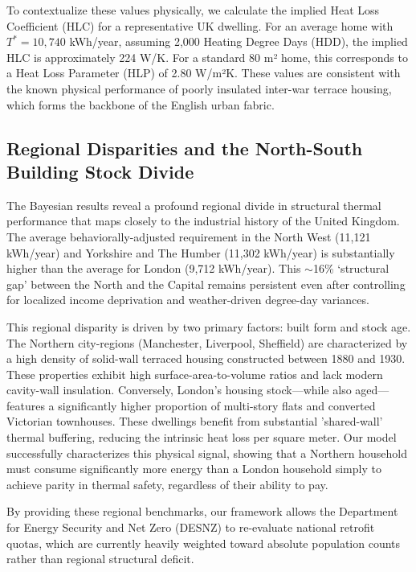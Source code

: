 \documentclass[11pt, a4paper, twocolumn, numbers]{elsarticle}
\begin{document}
To contextualize these values physically, we calculate the implied Heat Loss Coefficient (HLC) 
for a representative UK dwelling. For an average home with $T^* = 10{,}740$ kWh/year, 
assuming 2,000 Heating Degree Days (HDD), the implied HLC is approximately 224 W/K. 
For a standard 80 m² home, this corresponds to a Heat Loss Parameter (HLP) of 2.80 W/m²K. These values are consistent with the known physical performance of poorly insulated inter-war terrace housing, which forms the backbone of the English urban fabric.

\subsection{Regional Disparities and the North-South Building Stock Divide}\label{regional-disparities}

The Bayesian results reveal a profound regional divide in structural thermal performance that maps closely to the industrial history of the United Kingdom. The average behaviorally-adjusted requirement in the North West (11,121 kWh/year) and Yorkshire and The Humber (11,302 kWh/year) is substantially higher than the average for London (9,712 kWh/year). This $\sim$16\% `structural gap' between the North and the Capital remains persistent even after controlling for localized income deprivation and weather-driven degree-day variances.

This regional disparity is driven by two primary factors: built form and stock age. The Northern city-regions (Manchester, Liverpool, Sheffield) are characterized by a high density of solid-wall terraced housing constructed between 1880 and 1930. These properties exhibit high surface-area-to-volume ratios and lack modern cavity-wall insulation. Conversely, London’s housing stock—while also aged—features a significantly higher proportion of multi-story flats and converted Victorian townhouses. These dwellings benefit from substantial 'shared-wall' thermal buffering, reducing the intrinsic heat loss per square meter. Our model successfully characterizes this physical signal, showing that a Northern household must consume significantly more energy than a London household simply to achieve parity in thermal safety, regardless of their ability to pay.

By providing these regional benchmarks, our framework allows the Department for Energy Security and Net Zero (DESNZ) to re-evaluate national retrofit quotas, which are currently heavily weighted toward absolute population counts rather than regional structural deficit.
\end{document}
